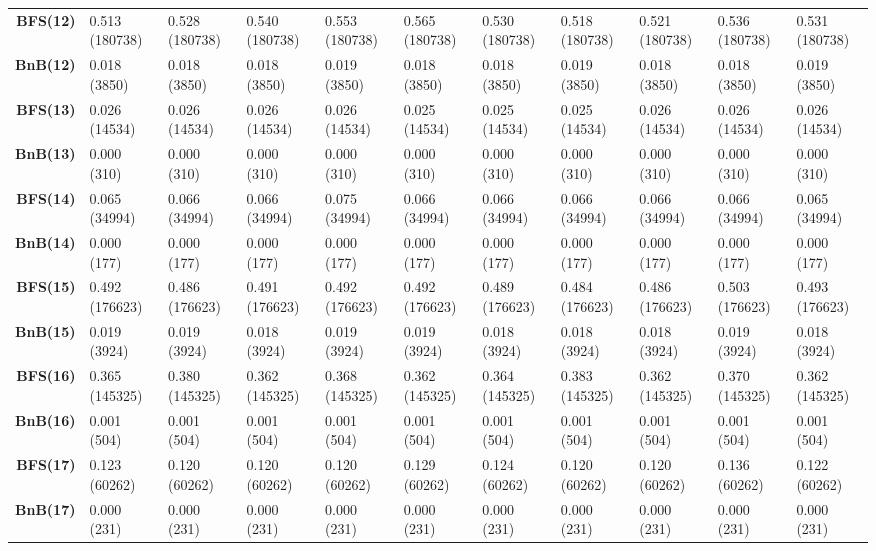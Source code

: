 \begin{table}[ht]
\begin{adjustbox}{width=1.5\textwidth,center}
\begin{tabular}{r|llllllllll}
\textbf{BFS(12)} & 0.513 (180738) & 0.528 (180738) & 0.540 (180738) & 0.553 (180738) & 0.565 (180738) & 0.530 (180738) & 0.518 (180738) & 0.521 (180738) & 0.536 (180738) & 0.531 (180738) \\
\textbf{BnB(12)} & 0.018 (3850) & 0.018 (3850) & 0.018 (3850) & 0.019 (3850) & 0.018 (3850) & 0.018 (3850) & 0.019 (3850) & 0.018 (3850) & 0.018 (3850) & 0.019 (3850) \\ \hline

\textbf{BFS(13)} & 0.026 (14534) & 0.026 (14534) & 0.026 (14534) & 0.026 (14534) & 0.025 (14534) & 0.025 (14534) & 0.025 (14534) & 0.026 (14534) & 0.026 (14534) & 0.026 (14534) \\
\textbf{BnB(13)} & 0.000 (310) & 0.000 (310) & 0.000 (310) & 0.000 (310) & 0.000 (310) & 0.000 (310) & 0.000 (310) & 0.000 (310) & 0.000 (310) & 0.000 (310) \\ \hline

\textbf{BFS(14)} & 0.065 (34994) & 0.066 (34994) & 0.066 (34994) & 0.075 (34994) & 0.066 (34994) & 0.066 (34994) & 0.066 (34994) & 0.066 (34994) & 0.066 (34994) & 0.065 (34994) \\
\textbf{BnB(14)} & 0.000 (177) & 0.000 (177) & 0.000 (177) & 0.000 (177) & 0.000 (177) & 0.000 (177) & 0.000 (177) & 0.000 (177) & 0.000 (177) & 0.000 (177) \\ \hline

\textbf{BFS(15)} & 0.492 (176623) & 0.486 (176623) & 0.491 (176623) & 0.492 (176623) & 0.492 (176623) & 0.489 (176623) & 0.484 (176623) & 0.486 (176623) & 0.503 (176623) & 0.493 (176623) \\
\textbf{BnB(15)} & 0.019 (3924) & 0.019 (3924) & 0.018 (3924) & 0.019 (3924) & 0.019 (3924) & 0.018 (3924) & 0.018 (3924) & 0.018 (3924) & 0.019 (3924) & 0.018 (3924) \\ \hline

\textbf{BFS(16)} & 0.365 (145325) & 0.380 (145325) & 0.362 (145325) & 0.368 (145325) & 0.362 (145325) & 0.364 (145325) & 0.383 (145325) & 0.362 (145325) & 0.370 (145325) & 0.362 (145325) \\
\textbf{BnB(16)} & 0.001 (504) & 0.001 (504) & 0.001 (504) & 0.001 (504) & 0.001 (504) & 0.001 (504) & 0.001 (504) & 0.001 (504) & 0.001 (504) & 0.001 (504) \\ \hline

\textbf{BFS(17)} & 0.123 (60262) & 0.120 (60262) & 0.120 (60262) & 0.120 (60262) & 0.129 (60262) & 0.124 (60262) & 0.120 (60262) & 0.120 (60262) & 0.136 (60262) & 0.122 (60262) \\
\textbf{BnB(17)} & 0.000 (231) & 0.000 (231) & 0.000 (231) & 0.000 (231) & 0.000 (231) & 0.000 (231) & 0.000 (231) & 0.000 (231) & 0.000 (231) & 0.000 (231) \\ \hline


\end{tabular}
\end{adjustbox}
\end{table}
